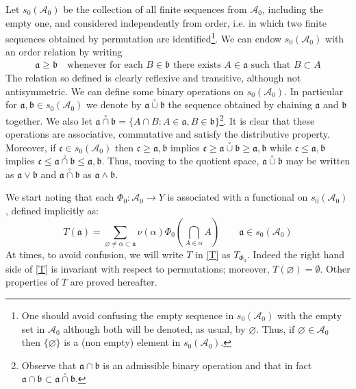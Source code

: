 \documentclass[11pt]{amsart}
\theoremstyle{plain}
\begin{document}
Let $s_0({\mathscr{A}}_0)$ be the collection of all finite sequences from ${\mathscr{A}}_0$, including the
empty one, and considered independently from order, i.e. in which two finite 
sequences obtained by permutation are identified\footnote{One should avoid confusing the empty sequence in $s_0({\mathscr{A}}_0)$ with the
empty set in ${\mathscr{A}}_0$ although both will be denoted, as usual, by ${\varnothing}$. Thus, if
${\varnothing}\in{\mathscr{A}}_0$ then $\{{\varnothing}\}$ is a (non empty) element in $s_0({\mathscr{A}}_0)$.}. 
We can endow $s_0({\mathscr{A}}_0)$ with an order relation by writing
\begin{align}
\label{order}
{\mathfrak a}\ge{\mathfrak b}
\quad\text{whenever for each }B\in{\mathfrak b}\text{ there exists }A\in{\mathfrak a}\text{ such that } 
B\subset A
\end{align}
The relation so defined is clearly reflexive and transitive, although not antisymmetric.
We can define some binary operations on $s_0({\mathscr{A}}_0)$. In particular for 
${\mathfrak a},{\mathfrak b}\in s_0({\mathscr{A}}_0)$ we denote by ${\mathfrak a}{\overset\circ\cup}{\mathfrak b}$ the sequence obtained by 
chaining ${\mathfrak a}$ and ${\mathfrak b}$ together. We also let ${\mathfrak a}{\overset\circ\cap}{\mathfrak b}=\{A\cap B:A\in{\mathfrak a},B\in{\mathfrak b}\}$\footnote{Observe that ${\mathfrak a}\cap{\mathfrak b}$ is an admissible binary operation and that in fact
${\mathfrak a}\cap{\mathfrak b}\subset{\mathfrak a}{\overset\circ\cap}{\mathfrak b}$.}.
It is clear that these operations are associative, commutative and satisfy the distributive 
property. Moreover, if ${\mathfrak c}\in s_0({\mathscr{A}}_0)$ then ${\mathfrak c}\ge{\mathfrak a},{\mathfrak b}$ implies 
${\mathfrak c}\ge{\mathfrak a}{\overset\circ\cup}{\mathfrak b}\ge{\mathfrak a},{\mathfrak b}$ while ${\mathfrak c}\le{\mathfrak a},{\mathfrak b}$ implies
${\mathfrak c}\le{\mathfrak a}{\overset\circ\cap}{\mathfrak b}\le{\mathfrak a},{\mathfrak b}$. Thus, moving to the quotient space, ${\mathfrak a}{\overset\circ\cup}{\mathfrak b}$
may be written as ${\mathfrak a}\vee{\mathfrak b}$ and ${\mathfrak a}{\overset\circ\cap}{\mathfrak b}$ as ${\mathfrak a}\wedge{\mathfrak b}$.

We start noting that each $\Phi_0:{\mathscr{A}}_0\to Y$ is associated with a 
functional on $s_0({\mathscr{A}}_0)$, defined implicitly 
as:
\begin{equation}
\label{T}
T({\mathfrak a})
=
\sum_{{\varnothing}\ne\alpha\subset{\mathfrak a}}\nu(\alpha)\Phi_0\left(\bigcap_{A\in\alpha}A\right)
\qquad
{\mathfrak a}\in s_0({\mathscr{A}}_0)
\end{equation}
At times, to avoid confusion, we will write $T$ in \eqref{T} as $T_{\Phi_0}$.
Indeed the right hand side of \eqref{T} is invariant with respect to permutations;
moreover, $T({\varnothing})={\emptyset}$. Other properties of $T$ are proved hereafter.
\end{document}
